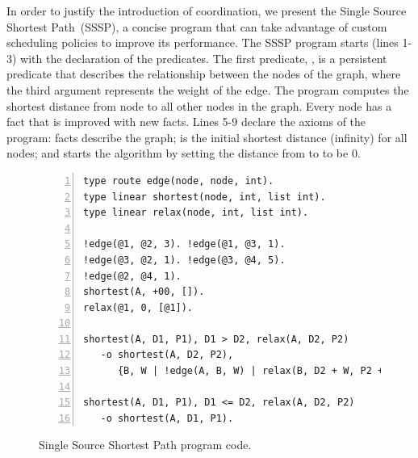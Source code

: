 In order to justify the introduction of coordination, we present the Single
Source Shortest Path~(SSSP), a concise program that can take advantage of custom
scheduling policies to improve its performance. The SSSP program starts (lines
1-3) with the declaration of the predicates. The first predicate, ,
is a persistent predicate that describes the relationship between the nodes of
the graph, where the third argument represents the weight of the edge.  The
program computes the shortest distance from node  to all other nodes
in the graph. Every node has a  fact that is improved with new
 facts.  Lines 5-9 declare the axioms of the program:
 facts describe the graph;  is the
initial shortest distance (infinity) for all nodes; and  starts the algorithm by setting the distance from  to
 to be 0.

\begin{figure}[ht]
\begin{Verbatim}[numbers=left,fontsize=\scriptsize]
type route edge(node, node, int).
type linear shortest(node, int, list int).
type linear relax(node, int, list int).

!edge(@1, @2, 3). !edge(@1, @3, 1).
!edge(@3, @2, 1). !edge(@3, @4, 5).
!edge(@2, @4, 1).
shortest(A, +00, []).
relax(@1, 0, [@1]).

shortest(A, D1, P1), D1 > D2, relax(A, D2, P2)
   -o shortest(A, D2, P2),
      {B, W | !edge(A, B, W) | relax(B, D2 + W, P2 ++ [B])}.

shortest(A, D1, P1), D1 <= D2, relax(A, D2, P2)
   -o shortest(A, D1, P1).
\end{Verbatim}
\caption{Single Source Shortest Path program code.}
\label{code:shortest_path_program}
\end{figure}

